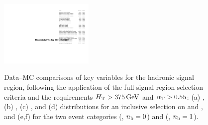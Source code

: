 \begin{figure}[h!]
{    \label{fig:figures_HT_0}
    \includegraphics[width=0.4\textwidth,page=123]{figures/data-mc/v21/had/hadronicLook_375_pfJet_ge2j.pdf}
  } 
   \\
  \caption{\label{fig:control-plots-sig} Data--MC comparisons of key
    variables for the hadronic signal region, following the
    application of the full signal region selection criteria and the
    requirements $\mbox{$H_\text{T}$} > 375\,\text{Ge\hspace{-.08em}V}$ and $\alpha_{\text{T}} > 0.55$: (a) \njet,
    (b) \nb, (c) \mht, and (d) \met distributions for an inclusive 
    selection on \njet and \nb, and (e,f) \scalht  for the two 
    event categories (\njetlow, $n_{\text{b}} = 0$) and (\njethigh, $n_{\text{b}} = 1$). }
\end{figure}

